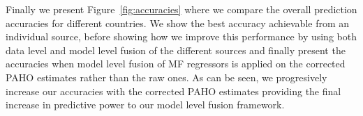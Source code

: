 Finally we present Figure~\ref{fig:accuracies} where we compare
the overall prediction accuracies for different countries. We show the best
accuracy achievable from an individual source, before showing how we improve this 
performance by using both data level and model level fusion of the different sources and finally 
present the accuracies when model level fusion of MF regressors is applied on the corrected PAHO 
estimates rather than the raw ones. As can be seen, we progresively increase our accuracies
with the corrected PAHO estimates providing the final increase in predictive power to 
our model level fusion framework.

